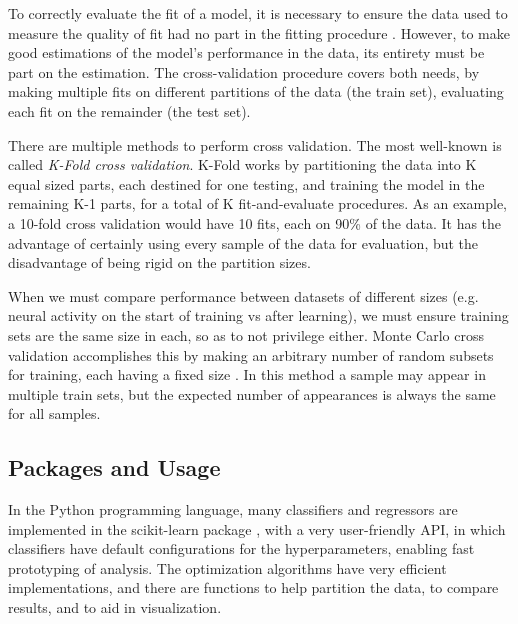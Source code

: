 To correctly evaluate the fit of a model, it is necessary to ensure the data used to measure the quality of fit had no part in the fitting procedure \cite{murphy2012machine, kohavi1995study}. However, to make good estimations of the model's performance in the data, its entirety must be part on the estimation. The cross-validation procedure covers both needs, by making multiple fits on different partitions of the data (the train set), evaluating each fit on the remainder (the test set).

There are multiple methods to perform cross validation. The most well-known is called \textit{K-Fold cross validation}. K-Fold works by partitioning the data into K equal sized parts, each destined for one testing, and training the model in the remaining K-1 parts, for a total of K fit-and-evaluate procedures. As an example, a 10-fold cross validation would have 10 fits, each on 90\% of the data. It has the advantage of certainly using every sample of the data for evaluation, but the disadvantage of being rigid on the partition sizes. 

When we must compare performance between datasets of different sizes (e.g. neural activity on the start of training vs after learning), we must ensure training sets are the same size in each, so as to not privilege either. Monte Carlo cross validation accomplishes this by making an arbitrary number of random subsets for training, each having a fixed size \cite{xu2001monte}. In this method a sample may appear in multiple train sets, but the expected number of appearances is always the same for all samples.

\subsection{Packages and Usage}
In the Python programming language, many classifiers and regressors are implemented in the scikit-learn package \cite{scikit-learn}, with a very user-friendly API, in which classifiers have default configurations for the hyperparameters, enabling fast prototyping of analysis.
The optimization algorithms have very efficient implementations, and there are functions to help partition the data, to compare results, and to aid in visualization. 